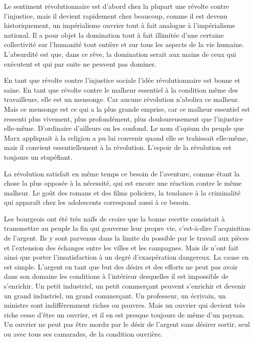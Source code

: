 \documentclass[french,twoside]{book} %
\begin{document}
Le sentiment révolutionnaire est d'abord chez la plupart une révolte contre l'injustice, mais il devient rapidement chez beaucoup, comme il est devenu historiquement, un impérialisme ouvrier tout à fait analogue à l'impérialisme national. Il a pour objet la domination tout à fait illimitée d'une certaine collectivité sur l'humanité tout entière et sur tous les aspects de la vie humaine. L'absurdité est que, dans ce rêve, la domination serait aux mains de ceux qui exécutent et qui par suite ne peuvent pas dominer.\par
En tant que révolte contre l'injustice sociale l'idée révolutionnaire est bonne et saine. En tant que révolte contre le malheur essentiel à la condition même des travailleurs, elle est un mensonge. Car aucune révolution n'abolira ce malheur. Mais ce mensonge est ce qui a la plus grande emprise, car ce malheur essentiel est ressenti plus vivement, plus profondément, plus douloureusement que l'injustice elle-même. D'ordinaire d'ailleurs on les confond. Le nom d'opium du peuple que Marx appliquait à la religion a pu lui convenir quand elle se trahissait elle-même, mais il convient essentiellement à la révolution. L'espoir de la révolution est toujours un stupéfiant.\par
La révolution satisfait en même temps ce besoin de l'aventure, comme étant la chose la plus opposée à la nécessité, qui est encore une réaction contre le même malheur. Le goût des romans et des films policiers, la tendance à la criminalité qui apparaît chez les adolescents correspond aussi à ce besoin.\par
\par
Les bourgeois ont été très naïfs de croire que la bonne recette consistait à transmettre au peuple la fin qui gouverne leur propre vie, c'est-à-dire l'acquisition de l'argent. Ils y sont parvenus dans la limite du possible par le travail aux pièces et l'extension des échanges entre les villes et les campagnes. Mais ils n'ont fait ainsi que porter l'insatisfaction à un degré d'exaspération dangereux. La cause en est simple. L'argent en tant que but des désirs et des efforts ne peut pas avoir dans son domaine les conditions à l'intérieur desquelles il est impossible de s'enrichir. Un petit industriel, un petit commerçant peuvent s'enrichir et devenir un grand industriel, un grand commerçant. Un professeur, un écrivain, un ministre sont indifféremment riches ou pauvres. Mais un ouvrier qui devient très riche cesse d'être un ouvrier, et il en est presque toujours de même d'un paysan. Un ouvrier ne peut pas être mordu par le désir de l'argent sans désirer sortir, seul ou avec tous ses camarades, de la condition ouvrière.\par
\end{document}
